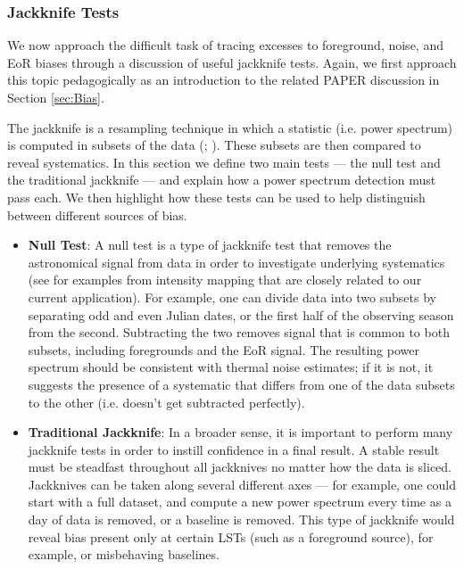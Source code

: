 \documentclass[preprint2,numberedappendix,tighten]{aastex6}  %
\begin{document}
\subsubsection{Jackknife Tests}
\label{sec:JackknifeOverview}

We now approach the difficult task of tracing excesses to foreground, noise, and EoR biases through a discussion of useful 
jackknife tests. Again, we first approach this topic pedagogically as an introduction to the related PAPER discussion in Section 
\ref{sec:Bias}. 

The jackknife is a resampling technique in which a statistic (i.e. power spectrum) is computed in subsets of the data (\citealt{quenouille1949}; \citealt{tukey1958}). These 
subsets are then compared to reveal systematics. In this section we define two main tests --- the null test and the traditional 
jackknife --- and explain how a power spectrum detection must pass each. We then highlight how these tests can be used to 
help distinguish between different sources of bias.
 
\begin{itemize}
\item \textbf{Null Test}: A null test is a type of jackknife test that removes the astronomical signal from data in order to 
investigate underlying systematics (see \citet{keating_et_al2016} for examples from intensity mapping that are closely related to our current application). For example, one can 
divide data into two subsets by separating odd and even Julian dates, or the first half of the observing season from the second. 
Subtracting the two removes signal that is common to both subsets, including foregrounds and the EoR signal. The resulting power 
spectrum should be consistent with thermal noise estimates; if it is not, it suggests the presence of a systematic that differs 
from one of the data subsets to the other (i.e. doesn't get subtracted perfectly). 
\item \textbf{Traditional Jackknife}: In a broader sense, it is important to perform many jackknife tests in order to instill 
confidence in a final result. A stable result must be steadfast throughout all jackknives no matter how the data is sliced. 
Jackknives can be taken along several different axes --- for example, one could start with a full dataset, and compute a new 
power spectrum every time as a day of data is removed, or a baseline is removed. This type of jackknife would reveal bias 
present only at certain LSTs (such as a foreground source), for example, or misbehaving baselines.
\end{itemize}
\end{document}

